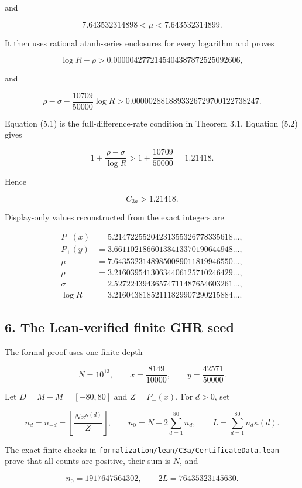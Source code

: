 \documentclass[
  10pt,
]{article}
\begin{document}
and

\[
7.643532314898<\mu<7.643532314899.
\]

It then uses rational atanh-series enclosures for every logarithm and
proves

\[
\log R-\rho
>0.0000042772145404387872525092606,
\tag{5.1}
\]

and

\[
\rho-\sigma-\frac{10709}{50000}\log R
>0.0000028818893326729700122738247.
\tag{5.2}
\]

Equation (5.1) is the full-difference-rate condition in Theorem 3.1.
Equation (5.2) gives

\[
1+\frac{\rho-\sigma}{\log R}
>1+\frac{10709}{50000}
=1.21418.
\]

Hence

\[
\boxed{C_{3a}>1.21418}.
\]

Display-only values reconstructed from the exact integers are

\[
\begin{aligned}
P_-(x)&=5.21472255204231355326778335618\ldots,\\
P_+(y)&=3.66110218660138413370190644948\ldots,\\
\mu&=7.64353231489850089011819946550\ldots,\\
\rho&=3.21603954130634406125710246429\ldots,\\
\sigma&=2.52722439436574711487654603261\ldots,\\
\log R&=3.21604381852111829907290215884\ldots.
\end{aligned}
\]

\subsection{6. The Lean-verified finite GHR
seed}\label{the-lean-verified-finite-ghr-seed}

The formal proof uses one finite depth

\[
N=10^{13},\qquad x=\frac{8149}{10000},\qquad y=\frac{42571}{50000}.
\]

Let \(D=M-M=[-80,80]\) and \(Z=P_-(x)\). For \(d>0\), set

\[
n_d=n_{-d}=\left\lfloor\frac{Nx^{\kappa(d)}}Z\right\rfloor,
\qquad
n_0=N-2\sum_{d=1}^{80}n_d,
\qquad
L=\sum_{d=1}^{80}n_d\kappa(d).
\]

The exact finite checks in
\texttt{formalization/lean/C3a/CertificateData.lean} prove that all
counts are positive, their sum is \(N\), and

\[
n_0=1917647564302,\qquad 2L=76435323145630.
\]
\end{document}
